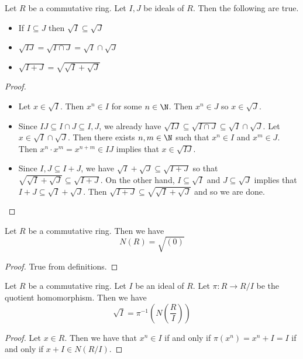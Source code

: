 \documentclass[a4paper]{article}
\begin{document}
\begin{prp}{}{} Let $R$ be a commutative ring. Let $I,J$ be ideals of $R$. Then the following are true. 
\begin{itemize}
\item If $I\subseteq J$ then $\sqrt{I}\subseteq\sqrt{J}$
\item $\sqrt{IJ}=\sqrt{I\cap J}=\sqrt{I}\cap\sqrt{J}$
\item $\sqrt{I+J}=\sqrt{\sqrt{I}+\sqrt{J}}$
\end{itemize} 
\begin{proof}
\begin{itemize}
\item Let $x\in\sqrt{I}$. Then $x^n\in I$ for some $n\in\N$. Then $x^n\in J$ so $x\in\sqrt{J}$. 
\item Since $IJ\subseteq I\cap J\subseteq I,J$, we already have $\sqrt{IJ}\subseteq\sqrt{I\cap J}\subseteq\sqrt{I}\cap\sqrt{J}$. Let $x\in\sqrt{I}\cap\sqrt{J}$. Then there exists $n,m\in\N$ such that $x^n\in I$ and $x^m\in J$. Then $x^n\cdot x^m=x^{n+m}\in IJ$ implies that $x\in\sqrt{IJ}$. 
\item Since $I,J\subseteq I+J$, we have $\sqrt{I}+\sqrt{J}\subseteq\sqrt{I+J}$ so that $\sqrt{\sqrt{I}+\sqrt{J}}\subseteq\sqrt{I+J}$. On the other hand, $I\subseteq\sqrt{I}$ and $J\subseteq\sqrt{J}$ implies that $I+J\subseteq\sqrt{I}+\sqrt{J}$. Then $\sqrt{I+J}\subseteq\sqrt{\sqrt{I}+\sqrt{J}}$ and so we are done. 
\end{itemize}
\end{proof}
\end{prp}

\begin{lmm}{}{} Let $R$ be a commutative ring. Then we have $$N(R)=\sqrt{(0)}$$ 
\begin{proof}
True from definitions. 
\end{proof}
\end{lmm}

\begin{lmm}{}{} Let $R$ be a commutative ring. Let $I$ be an ideal of $R$. Let $\pi:R\to R/I$ be the quotient homomorphism. Then we have $$\sqrt{I}=\pi^{-1}\left(N\left(\frac{R}{I}\right)\right)$$ 
\begin{proof}
Let $x\in R$. Then we have that $x^n\in I$ if and only if $\pi(x^n)=x^n+I=I$ if and only if $x+I\in N(R/I)$. 
\end{proof}
\end{lmm}
\end{document}
